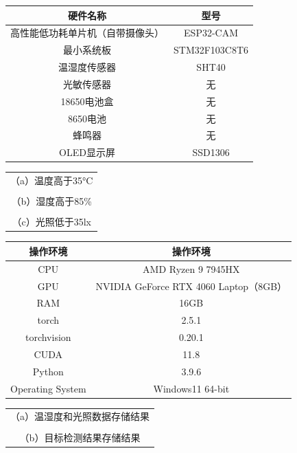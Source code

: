 \documentclass[12pt, a4paper, twoside]{ctexart}
\begin{document}
\begin{table}[htbp]
\centering
\begin{tabular}{|c|c|}
\hline
硬件名称 & 型号 \\
\hline
高性能低功耗单片机（自带摄像头） & ESP32-CAM \\
\hline
最小系统板 & STM32F103C8T6 \\
\hline
温湿度传感器 & SHT40 \\
\hline
光敏传感器 & 无 \\
\hline
18650电池盒 & 无 \\
\hline
8650电池 & 无 \\
\hline
蜂鸣器 & 无 \\
\hline
OLED显示屏 & SSD1306 \\
\hline
\end{tabular}
\end{table}

\begin{table}[htbp]
\centering
\begin{tabular}{|c|}
\hline
 \\
\hline
（a）温度高于35°C \\
\hline
 \\
\hline
（b）湿度高于85\% \\
\hline
 \\
\hline
（c）光照低于35lx \\
\hline
\end{tabular}
\end{table}

\begin{table}[htbp]
\centering
\begin{tabular}{|c|c|}
\hline
操作环境 & 操作环境 \\
\hline
CPU & AMD Ryzen 9 7945HX \\
\hline
GPU & NVIDIA GeForce RTX 4060 Laptop（8GB） \\
\hline
RAM & 16GB \\
\hline
torch & 2.5.1 \\
\hline
torchvision & 0.20.1 \\
\hline
CUDA & 11.8 \\
\hline
Python & 3.9.6 \\
\hline
Operating System & Windows11 64-bit \\
\hline
\end{tabular}
\end{table}

\begin{table}[htbp]
\centering
\begin{tabular}{|c|}
\hline
 \\
\hline
（a）温湿度和光照数据存储结果 \\
\hline
 \\
\hline
（b）目标检测结果存储结果 \\
\hline
\end{tabular}
\end{table}
\end{document}
